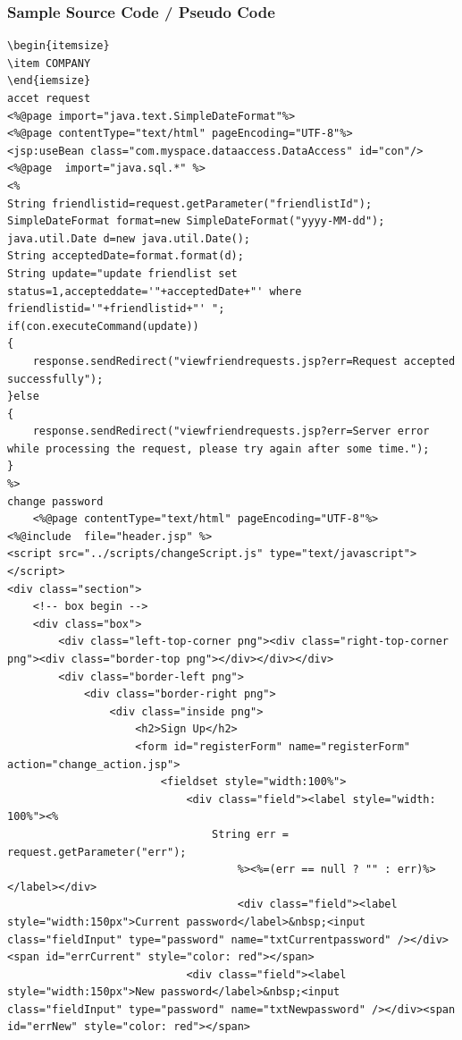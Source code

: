 \documentclass[a4paper,12pt]{article}
\begin{document}
\subsubsection{Sample Source Code / Pseudo Code}  
\hspace{5mm} 
\begin{verbatim}
\begin{itemsize}
\item COMPANY
\end{iemsize}
accet request
<%@page import="java.text.SimpleDateFormat"%>
<%@page contentType="text/html" pageEncoding="UTF-8"%>
<jsp:useBean class="com.myspace.dataaccess.DataAccess" id="con"/> 
<%@page  import="java.sql.*" %>
<%
String friendlistid=request.getParameter("friendlistId");
SimpleDateFormat format=new SimpleDateFormat("yyyy-MM-dd");
java.util.Date d=new java.util.Date();
String acceptedDate=format.format(d);
String update="update friendlist set status=1,accepteddate='"+acceptedDate+"' where friendlistid='"+friendlistid+"' ";
if(con.executeCommand(update))
{
    response.sendRedirect("viewfriendrequests.jsp?err=Request accepted successfully");
}else
{
    response.sendRedirect("viewfriendrequests.jsp?err=Server error while processing the request, please try again after some time.");
}
%>
change password
    <%@page contentType="text/html" pageEncoding="UTF-8"%>
<%@include  file="header.jsp" %>
<script src="../scripts/changeScript.js" type="text/javascript"></script>
<div class="section">
    <!-- box begin -->
    <div class="box">
        <div class="left-top-corner png"><div class="right-top-corner png"><div class="border-top png"></div></div></div>
        <div class="border-left png">
            <div class="border-right png">
                <div class="inside png">
                    <h2>Sign Up</h2>
                    <form id="registerForm" name="registerForm"  action="change_action.jsp">
                        <fieldset style="width:100%">
                            <div class="field"><label style="width: 100%"><%
                                String err = request.getParameter("err");
                                    %><%=(err == null ? "" : err)%></label></div>
                                    <div class="field"><label style="width:150px">Current password</label>&nbsp;<input class="fieldInput" type="password" name="txtCurrentpassword" /></div><span id="errCurrent" style="color: red"></span>
                            <div class="field"><label style="width:150px">New password</label>&nbsp;<input class="fieldInput" type="password" name="txtNewpassword" /></div><span id="errNew" style="color: red"></span>

\end{verbatim}
\end{document}
